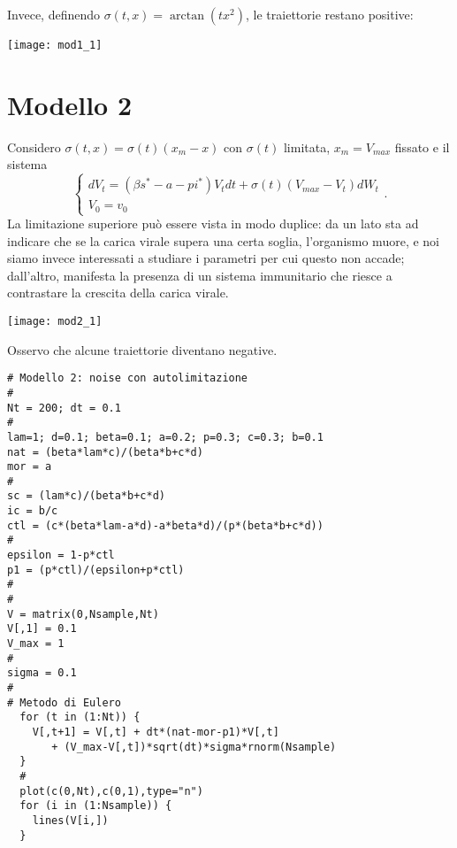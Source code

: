 \documentclass[12pt,a4paper,oneside]{amsart}
\theoremstyle{definition}
\begin{document}

Invece, definendo $\sigma(t,x)=\arctan(tx^2)$, le traiettorie restano positive:
\begin{center}
\texttt{[image: mod1\_1]}
\end{center}

\section{Modello 2}
Considero $\sigma(t,x)=\sigma(t)(x_m-x)$ con $\sigma(t)$ limitata, $x_m=V_{max}$ fissato e il sistema $$\begin{cases}
dV_t=\left(\beta s^* -a -p i^*\right)V_tdt + \sigma(t)(V_{max}-V_t)dW_t\\
V_0 = v_0
\end{cases}.$$
La limitazione superiore può essere vista in modo duplice: da un lato sta ad indicare che se la carica virale supera una certa soglia, l'organismo muore, e noi siamo invece interessati a studiare i parametri per cui questo non accade; dall'altro, manifesta la presenza di un sistema immunitario che riesce a contrastare la crescita della carica virale.

\begin{center}
\texttt{[image: mod2\_1]}
\end{center}

Osservo che alcune traiettorie diventano negative.

\begin{center}
\begin{verbatim}
# Modello 2: noise con autolimitazione
#
Nt = 200; dt = 0.1
#
lam=1; d=0.1; beta=0.1; a=0.2; p=0.3; c=0.3; b=0.1
nat = (beta*lam*c)/(beta*b+c*d)
mor = a
#
sc = (lam*c)/(beta*b+c*d)
ic = b/c
ctl = (c*(beta*lam-a*d)-a*beta*d)/(p*(beta*b+c*d))
#
epsilon = 1-p*ctl
p1 = (p*ctl)/(epsilon+p*ctl)
#
#
V = matrix(0,Nsample,Nt)
V[,1] = 0.1
V_max = 1
#
sigma = 0.1 
#
# Metodo di Eulero
  for (t in (1:Nt)) {
    V[,t+1] = V[,t] + dt*(nat-mor-p1)*V[,t] 
       + (V_max-V[,t])*sqrt(dt)*sigma*rnorm(Nsample)
  }
  #
  plot(c(0,Nt),c(0,1),type="n")
  for (i in (1:Nsample)) {
    lines(V[i,])
  }
\end{verbatim}
\end{center}
\end{document}
